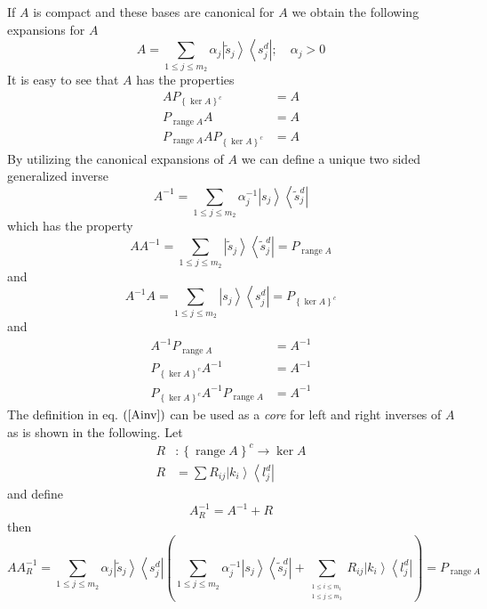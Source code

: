 \documentclass[aps,preprint]{revtex4}%
\begin{document}
If $A$ is compact and these bases are canonical for $A$ we obtain the
following expansions for $A$
\begin{equation}
A=\sum_{1\leq j\leq m_{2}}\alpha_{j}\left\vert \tilde{s}_{j}\right\rangle
\left\langle s_{j}^{d}\right\vert ;\quad\alpha_{j}>0
\end{equation}
It is easy to see that $A$ has the properties
\begin{align}
AP_{\left\{  \ker A\right\}  ^{c}}  & =A\nonumber\\
P_{\operatorname{range}A}A  & =A\nonumber\\
P_{\operatorname{range}A}AP_{\left\{  \ker A\right\}  ^{c}}  & =A
\end{align}
By utilizing the canonical expansions of $A$ we can define a unique two sided
generalized inverse
\begin{equation}
A^{-1}=\sum_{1\leq j\leq m_{2}}\alpha_{j}^{-1}\left\vert s_{j}\right\rangle
\left\langle \tilde{s}_{j}^{d}\right\vert \label{Ainv}%
\end{equation}
which has the property
\begin{equation}
AA^{-1}=\sum_{1\leq j\leq m_{2}}\left\vert \tilde{s}_{j}\right\rangle
\left\langle \tilde{s}_{j}^{d}\right\vert =P_{\operatorname{range}A}%
\end{equation}
and
\begin{equation}
A^{-1}A=\sum_{1\leq j\leq m_{2}}\left\vert s_{j}\right\rangle \left\langle
s_{j}^{d}\right\vert =P_{\left\{  \ker A\right\}  ^{c}}%
\end{equation}
and\
\begin{align}
A^{-1}P_{\operatorname{range}A}  & =A^{-1}\nonumber\\
P_{\left\{  \ker A\right\}  ^{c}}A^{-1}  & =A^{-1}\nonumber\\
P_{\left\{  \ker A\right\}  ^{c}}A^{-1}P_{\operatorname{range}A}  & =A^{-1}%
\end{align}
The definition in eq. $\left(  \ref{Ainv}\right)  $ can be used as a
\emph{core} for left and right inverses of $A$ as is shown in the following.
Let
\begin{align}
R  & :\left\{  \operatorname{range}A\right\}  ^{c}\longrightarrow\ker
A\nonumber\\
R  & =\sum R_{ij}\left\vert k_{i}\right\rangle \left\langle l_{j}%
^{d}\right\vert
\end{align}
and define
\begin{equation}
A_{R}^{-1}=A^{-1}+R
\end{equation}
then
\begin{equation}
AA_{R}^{-1}=\sum_{1\leq j\leq m_{2}}\alpha_{j}\left\vert \tilde{s}%
_{j}\right\rangle \left\langle s_{j}^{d}\right\vert \left(  \sum_{1\leq j\leq
m_{2}}\alpha_{j}^{-1}\left\vert s_{j}\right\rangle \left\langle \tilde{s}%
_{j}^{d}\right\vert +\sum_{_{\substack{1\leq i\leq m_{1}\\1\leq j\leq m_{3}}%
}}R_{ij}\left\vert k_{i}\right\rangle \left\langle l_{j}^{d}\right\vert
\right)  =P_{\operatorname{range}A}%
\end{equation}
\end{document}
